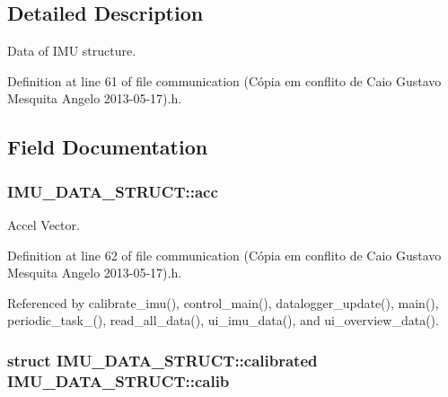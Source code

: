 \subsection{Detailed Description}
Data of I\-M\-U structure. 

Definition at line 61 of file communication (\-Cópia em conflito de Caio Gustavo Mesquita Angelo 2013-\/05-\/17).\-h.



\subsection{Field Documentation}
\hypertarget{structIMU__DATA__STRUCT_a448f284bf44eb503affda586ad5fa9d2}{
\subsubsection[{acc}]{ I\-M\-U\-\_\-\-D\-A\-T\-A\-\_\-\-S\-T\-R\-U\-C\-T\-::acc}}\label{structIMU__DATA__STRUCT_a448f284bf44eb503affda586ad5fa9d2}


Accel Vector. 



Definition at line 62 of file communication (\-Cópia em conflito de Caio Gustavo Mesquita Angelo 2013-\/05-\/17).\-h.



Referenced by calibrate\-\_\-imu(), control\-\_\-main(), datalogger\-\_\-update(), main(), periodic\-\_\-task\-\_(), read\-\_\-all\-\_\-data(), ui\-\_\-imu\-\_\-data(), and ui\-\_\-overview\-\_\-data().

\hypertarget{structIMU__DATA__STRUCT_aeffe3c3c5a7191a5cef16e7aab6c3795}{
\subsubsection[{calib}]{\setlength{\rightskip}{0pt plus 5cm}struct {\bf I\-M\-U\-\_\-\-D\-A\-T\-A\-\_\-\-S\-T\-R\-U\-C\-T\-::calibrated} I\-M\-U\-\_\-\-D\-A\-T\-A\-\_\-\-S\-T\-R\-U\-C\-T\-::calib}}\label{structIMU__DATA__STRUCT_aeffe3c3c5a7191a5cef16e7aab6c3795}


